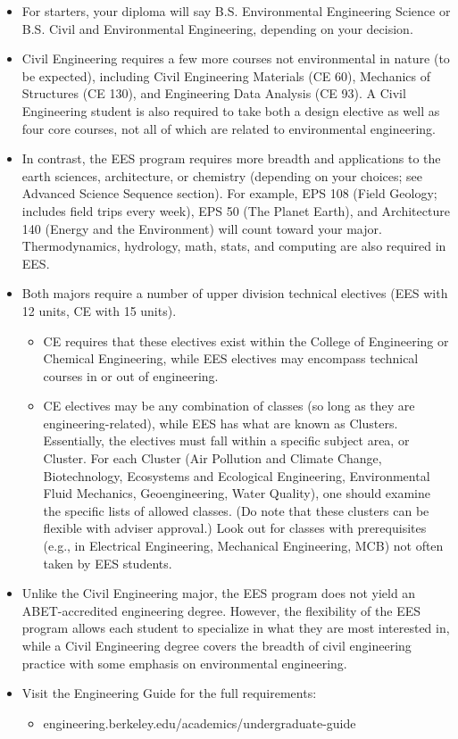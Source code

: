 \begin{itemize}
  \item For starters, your diploma will say B.S. Environmental Engineering Science or B.S. Civil and Environmental Engineering, depending on your decision.
  \item Civil Engineering requires a few more courses not environmental in nature (to be expected), including Civil Engineering Materials (CE 60), Mechanics of Structures (CE 130), and Engineering Data Analysis (CE 93). A Civil Engineering student is also required to take both a design elective as well as four core courses, not all of which are related to environmental engineering.
  \item In contrast, the EES program requires more breadth and applications to the earth sciences, architecture, or chemistry (depending on your choices; see Advanced Science Sequence section). For example, EPS 108 (Field Geology; includes field trips every week), EPS 50 (The Planet Earth), and Architecture 140 (Energy and the Environment) will count toward your major. Thermodynamics, hydrology, math, stats, and computing are also required in EES.
  \item Both majors require a number of upper division technical electives (EES with 12 units, CE with 15 units).
  \begin{itemize}
    \item CE requires that these electives exist within the College of Engineering or Chemical Engineering, while EES electives may encompass technical courses in or out of engineering.
    \item CE electives may be any combination of classes (so long as they are engineering-related), while EES has what are known as Clusters. Essentially, the electives must fall within a specific subject area, or Cluster. For each Cluster (Air Pollution and Climate Change, Biotechnology, Ecosystems and Ecological Engineering, Environmental Fluid Mechanics, Geoengineering, Water Quality), one should examine the specific lists of allowed classes. (Do note that these clusters can be flexible with adviser approval.) Look out for classes with prerequisites (e.g., in Electrical Engineering, Mechanical Engineering, MCB) not often taken by EES students. 
  \end{itemize}
  \item Unlike the Civil Engineering major, the EES program does not yield an ABET-accredited engineering degree. However, the flexibility of the EES program allows each student to specialize in what they are most interested in, while a Civil Engineering degree covers the breadth of civil engineering practice with some emphasis on environmental engineering.
  \item Visit the Engineering Guide for the full requirements:
  \begin{itemize}
    \item {\selectfont engineering.berkeley.edu/academics/undergraduate-guide}
  \end{itemize}
\end{itemize}

